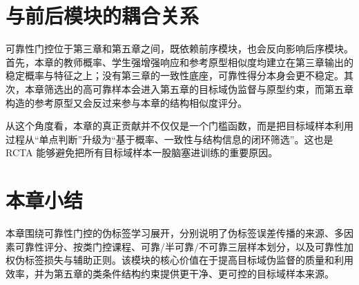 \section{与前后模块的耦合关系}
可靠性门控位于第三章和第五章之间，既依赖前序模块，也会反向影响后序模块。首先，本章的教师概率、学生强增强响应和参考原型相似度均建立在第三章输出的稳定概率与特征之上；没有第三章的一致性底座，可靠性得分本身会更不稳定。其次，本章筛选出的高可靠样本会进入第五章的目标域伪监督与原型约束，而第五章构造的参考原型又会反过来参与本章的结构相似度评分。

从这个角度看，本章的真正贡献并不仅仅是一个门槛函数，而是把目标域样本利用过程从“单点判断”升级为“基于概率、一致性与结构信息的闭环筛选”。这也是 RCTA 能够避免把所有目标域样本一股脑塞进训练的重要原因。

\section{本章小结}
本章围绕可靠性门控的伪标签学习展开，分别说明了伪标签误差传播的来源、多因素可靠性评分、按类门控课程、可靠/半可靠/不可靠三层样本划分，以及可靠性加权伪标签损失与辅助正则。该模块的核心价值在于提高目标域伪监督的质量和利用效率，并为第五章的类条件结构约束提供更干净、更可控的目标域样本来源。
